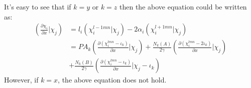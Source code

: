It's easy to see that if $k = y$ or $k = z$ then the above equation could be 
written as:
\begin{equation}
 \begin{split}
  \left(\frac{\partial \chi_{i}}{\partial x}|\chi_{j}\right)  &= 
 l_{i}(\chi_{i}^{l-1mn}|\chi_{j}) - 2\alpha_{i} (\chi_{i}^{l+1mn}|\chi_{j}) \\ 
 &=  PA_{k}(\frac{\partial(\chi_{i}^{lmn}-\iota_{k})}{\partial x}|\chi_{j}) + 
 \frac{N_{k}(A)}{2 \gamma}(\frac{\partial(\chi_{i}^{lmn}-2\iota_{k})}{\partial x}|\chi_{j}) 
 \\ 
 &+ \frac{N_{k}(B)}{2 \gamma}
 (\frac{\partial (\chi_{i}^{lmn}-\iota_{k}) }{\partial x}|\chi_{j}-\iota_{k}) 
 \end{split}
\end{equation}
However, if $k = x$, the above equation does not hold.

